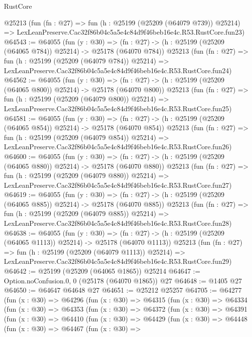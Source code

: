 \begin{lexlean}{RustCore}
\begin{coremodule}
    @25213
    (fun (fn : @27) =>
    fun (h : @25199 (@25209 (@64079 @739)) @25214) =>
    LexLeanPreserve.Cac32f86b04c5a5e4c84d9f46beb16e4c.R53.RustCore.fun23)
@64543 := @64055
    (fun (y : @30) =>
    (fn : @27) -> (h : @25199 (@25209 (@64065 @784)) @25214) -> @25178 (@64070 @784))
    @25213
    (fun (fn : @27) =>
    fun (h : @25199 (@25209 (@64079 @784)) @25214) =>
    LexLeanPreserve.Cac32f86b04c5a5e4c84d9f46beb16e4c.R53.RustCore.fun24)
@64562 := @64055
    (fun (y : @30) =>
    (fn : @27) -> (h : @25199 (@25209 (@64065 @800)) @25214) -> @25178 (@64070 @800))
    @25213
    (fun (fn : @27) =>
    fun (h : @25199 (@25209 (@64079 @800)) @25214) =>
    LexLeanPreserve.Cac32f86b04c5a5e4c84d9f46beb16e4c.R53.RustCore.fun25)
@64581 := @64055
    (fun (y : @30) =>
    (fn : @27) -> (h : @25199 (@25209 (@64065 @854)) @25214) -> @25178 (@64070 @854))
    @25213
    (fun (fn : @27) =>
    fun (h : @25199 (@25209 (@64079 @854)) @25214) =>
    LexLeanPreserve.Cac32f86b04c5a5e4c84d9f46beb16e4c.R53.RustCore.fun26)
@64600 := @64055
    (fun (y : @30) =>
    (fn : @27) -> (h : @25199 (@25209 (@64065 @880)) @25214) -> @25178 (@64070 @880))
    @25213
    (fun (fn : @27) =>
    fun (h : @25199 (@25209 (@64079 @880)) @25214) =>
    LexLeanPreserve.Cac32f86b04c5a5e4c84d9f46beb16e4c.R53.RustCore.fun27)
@64619 := @64055
    (fun (y : @30) =>
    (fn : @27) -> (h : @25199 (@25209 (@64065 @885)) @25214) -> @25178 (@64070 @885))
    @25213
    (fun (fn : @27) =>
    fun (h : @25199 (@25209 (@64079 @885)) @25214) =>
    LexLeanPreserve.Cac32f86b04c5a5e4c84d9f46beb16e4c.R53.RustCore.fun28)
@64638 := @64055
    (fun (y : @30) =>
    (fn : @27) -> (h : @25199 (@25209 (@64065 @1113)) @25214) -> @25178 (@64070 @1113))
    @25213
    (fun (fn : @27) =>
    fun (h : @25199 (@25209 (@64079 @1113)) @25214) =>
    LexLeanPreserve.Cac32f86b04c5a5e4c84d9f46beb16e4c.R53.RustCore.fun29)
@64642 := @25199 (@25209 (@64065 @1865)) @25214
@64647 := Option.noConfusion.{0, 0} (@25178 (@64070 @1865)) @27
@64648 := @1405 @27
@64650 := @64647 @64648 @27
@64651 := @25212 @25257
@64705 := @64277
    (fun (x : @30) =>
    @64296
      (fun (x : @30) =>
      @64315
        (fun (x : @30) =>
        @64334
          (fun (x : @30) =>
          @64353
            (fun (x : @30) =>
            @64372
              (fun (x : @30) =>
              @64391
                (fun (x : @30) =>
                @64410
                  (fun (x : @30) =>
                  @64429
                    (fun (x : @30) =>
                    @64448
                      (fun (x : @30) =>
                      @64467
                        (fun (x : @30) =>

\end{coremodule}
\end{lexlean}
